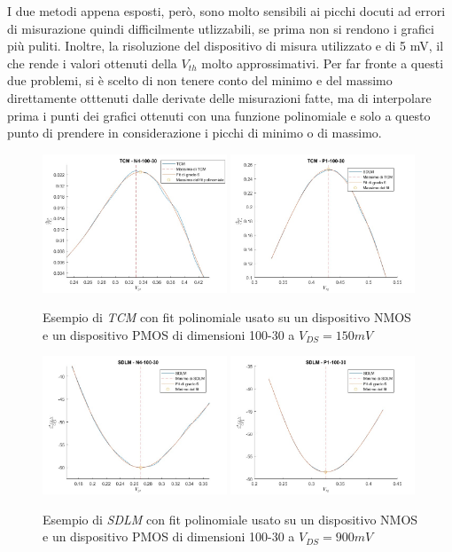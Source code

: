\documentclass[12pt, letterpaper]{book}
\begin{document}
I due metodi appena esposti, però, sono molto sensibili ai picchi docuti ad errori di misurazione quindi difficilmente utlizzabili, se prima non si rendono i grafici più puliti. Inoltre, la risoluzione del dispositivo di misura utilizzato e di 5 mV, il che rende i valori ottenuti della $V_{th}$ molto approssimativi.
Per far fronte a questi due problemi, si è scelto di non tenere conto del minimo e del massimo direttamente otttenuti dalle derivate delle misurazioni fatte, ma di interpolare prima i punti dei grafici ottenuti con una funzione polinomiale e solo a questo punto di prendere in considerazione i picchi di minimo o di massimo. \\

\begin{figure}[h!]
\centering
 \includegraphics[width=0.49\textwidth]{TCM-N4-100-30}
 \includegraphics[width=0.49\textwidth]{TCM-P1-100-30}
 \caption{Esempio di \emph{TCM} con fit polinomiale usato su un dispositivo NMOS e un dispositivo PMOS di dimensioni 100-30 a $V_{DS} = 150 mV$}
 \includegraphics[width=0.49\textwidth]{SDLM-N4-100-30}
 \includegraphics[width=0.49\textwidth]{SDLM-P1-100-30}
 \caption{Esempio di \emph{SDLM} con fit polinomiale usato su un dispositivo NMOS e un dispositivo PMOS di dimensioni 100-30 a $V_{DS} = 900 mV$}
\end{figure}
\end{document}
